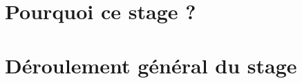 \section*{Pourquoi ce stage ?}
\paragraph{}

\paragraph{}

\paragraph{}

\paragraph{}
\subparagraph{}
\subparagraph{}
\subparagraph{}

\paragraph{}
\paragraph{}
 
\section*{Déroulement général du stage}
\paragraph{}
\paragraph{}
